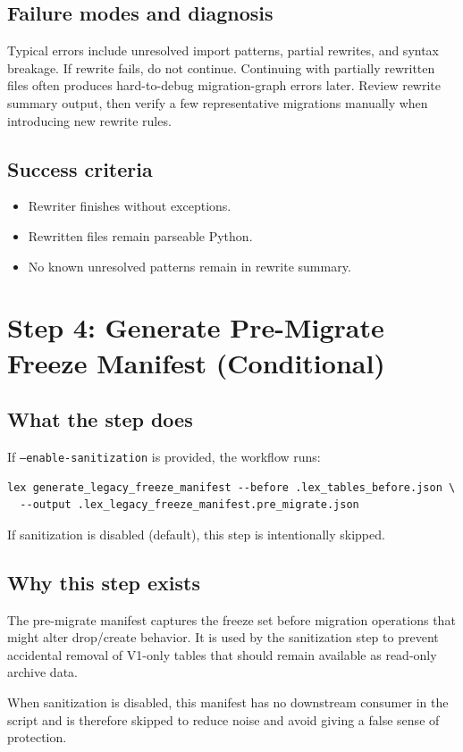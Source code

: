 \documentclass[11pt,a4paper]{article}
\begin{document}
\subsection*{Failure modes and diagnosis}
Typical errors include unresolved import patterns, partial rewrites, and syntax breakage.
If rewrite fails, do not continue. Continuing with partially rewritten files often produces
hard-to-debug migration-graph errors later. Review rewrite summary output, then verify a few
representative migrations manually when introducing new rewrite rules.

\subsection*{Success criteria}
\begin{itemize}[leftmargin=1.5em]
  \item Rewriter finishes without exceptions.
  \item Rewritten files remain parseable Python.
  \item No known unresolved patterns remain in rewrite summary.
\end{itemize}

\newpage
\section{Step 4: Generate Pre-Migrate Freeze Manifest (Conditional)}
\subsection*{What the step does}
If \texttt{--enable-sanitization} is provided, the workflow runs:
\begin{verbatim}
lex generate_legacy_freeze_manifest --before .lex_tables_before.json \
  --output .lex_legacy_freeze_manifest.pre_migrate.json
\end{verbatim}
If sanitization is disabled (default), this step is intentionally skipped.

\subsection*{Why this step exists}
The pre-migrate manifest captures the freeze set before migration operations that might alter
drop/create behavior. It is used by the sanitization step to prevent accidental removal of
V1-only tables that should remain available as read-only archive data.

When sanitization is disabled, this manifest has no downstream consumer in the script and is
therefore skipped to reduce noise and avoid giving a false sense of protection.
\end{document}
